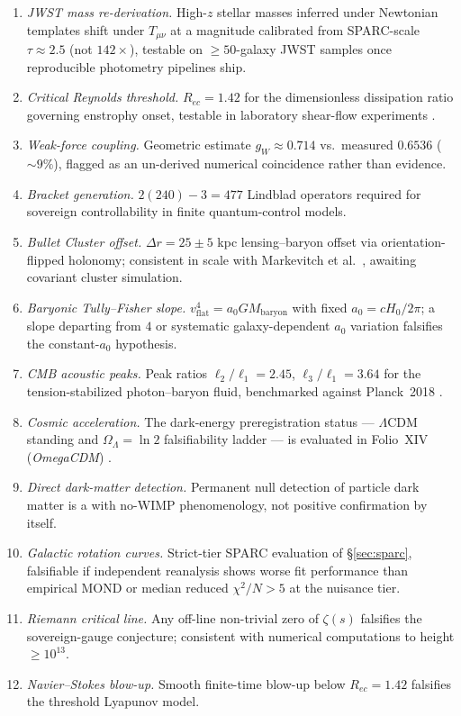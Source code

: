 \documentclass{alienfolio}
\begin{document}
\begin{enumerate}
\item \emph{JWST mass re-derivation.} High-$z$ stellar masses inferred
under Newtonian templates shift under $T_{\mu\nu}$ at a magnitude
calibrated from SPARC-scale $\tau \approx 2.5$ (not $142\times$),
testable on $\ge 50$-galaxy JWST samples once reproducible photometry
pipelines ship. 
\item \emph{Critical Reynolds threshold.} $R_{ec} = 1.42$ for the
dimensionless dissipation ratio governing enstrophy onset, testable in
laboratory shear-flow experiments \cite{constantin93}. 
\item \emph{Weak-force coupling.} Geometric estimate $g_{W} \approx 0.714$
vs.\ measured $0.6536$ ($\sim 9\%$), flagged as an un-derived numerical
coincidence rather than evidence. 
\item \emph{Bracket generation.} $2(240) - 3 = 477$ Lindblad operators
required for sovereign controllability in finite quantum-control models.
\item \emph{Bullet Cluster offset.} $\Delta r = 25 \pm 5$ kpc
lensing--baryon offset via orientation-flipped holonomy; consistent in
scale with Markevitch et al.\ \cite{markevitch06}, awaiting covariant
cluster simulation. 
\item \emph{Baryonic Tully--Fisher slope.} $v_{\mathrm{flat}}^{4} = a_{0} G
M_{\mathrm{baryon}}$ with fixed $a_{0} = cH_{0}/2\pi$; a slope departing
from $4$ or systematic galaxy-dependent $a_{0}$ variation falsifies the
constant-$a_{0}$ hypothesis. 
\item \emph{CMB acoustic peaks.} Peak ratios $\ell_{2}/\ell_{1} = 2.45$,
$\ell_{3}/\ell_{1} = 3.64$ for the tension-stabilized photon--baryon
fluid, benchmarked against Planck~2018 \cite{planck18}. 
\item \emph{Cosmic acceleration.} The dark-energy preregistration status
--- $\Lambda$CDM standing and $\Omega_{\Lambda} = \ln 2$ falsifiability
ladder --- is evaluated in Folio~XIV (\emph{OmegaCDM}) \cite{folio-xiv}.
\item \emph{Direct dark-matter detection.} Permanent null detection of
particle dark matter is a  with no-WIMP
phenomenology, not positive confirmation by itself. 
\item \emph{Galactic rotation curves.} Strict-tier SPARC evaluation of
\S\ref{sec:sparc}, falsifiable if independent reanalysis shows worse fit
performance than empirical MOND or median reduced $\chi^{2}/N > 5$ at the
nuisance tier. 
\item \emph{Riemann critical line.} Any off-line non-trivial zero of
$\zeta(s)$ falsifies the sovereign-gauge conjecture; consistent with
numerical computations to height $\ge 10^{13}$. 
\item \emph{Navier--Stokes blow-up.} Smooth finite-time blow-up below
$R_{ec} = 1.42$ falsifies the threshold Lyapunov model. 
\end{enumerate}
\end{document}
